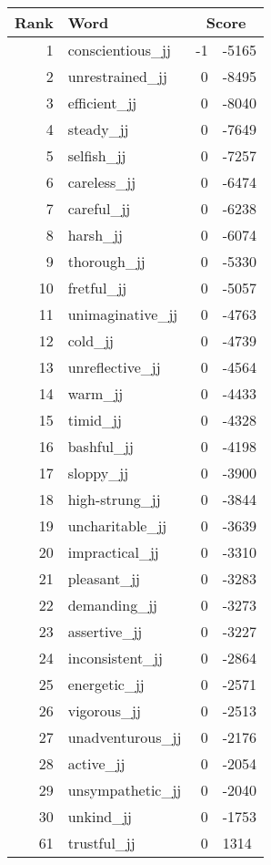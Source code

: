 \begin{longtable}[!htbp]{| rlr@{.}l |}
    \hline
    \textbf{Rank} & \textbf{Word} & \multicolumn{2}{c|}{\textbf{Score}} \\
    \hline
    \endhead
    1 & conscientious\_jj & -1 & -5165 \\
    2 & unrestrained\_jj & 0 & -8495 \\
    3 & efficient\_jj & 0 & -8040 \\
    4 & steady\_jj & 0 & -7649 \\
    5 & selfish\_jj & 0 & -7257 \\
    6 & careless\_jj & 0 & -6474 \\
    7 & careful\_jj & 0 & -6238 \\
    8 & harsh\_jj & 0 & -6074 \\
    9 & thorough\_jj & 0 & -5330 \\
    10 & fretful\_jj & 0 & -5057 \\
    11 & unimaginative\_jj & 0 & -4763 \\
    12 & cold\_jj & 0 & -4739 \\
    13 & unreflective\_jj & 0 & -4564 \\
    14 & warm\_jj & 0 & -4433 \\
    15 & timid\_jj & 0 & -4328 \\
    16 & bashful\_jj & 0 & -4198 \\
    17 & sloppy\_jj & 0 & -3900 \\
    18 & high-strung\_jj & 0 & -3844 \\
    19 & uncharitable\_jj & 0 & -3639 \\
    20 & impractical\_jj & 0 & -3310 \\
    21 & pleasant\_jj & 0 & -3283 \\
    22 & demanding\_jj & 0 & -3273 \\
    23 & assertive\_jj & 0 & -3227 \\
    24 & inconsistent\_jj & 0 & -2864 \\
    25 & energetic\_jj & 0 & -2571 \\
    26 & vigorous\_jj & 0 & -2513 \\
    27 & unadventurous\_jj & 0 & -2176 \\
    28 & active\_jj & 0 & -2054 \\
    29 & unsympathetic\_jj & 0 & -2040 \\
    30 & unkind\_jj & 0 & -1753 \\
    61 & trustful\_jj & 0 & 1314 \\

\end{longtable}
